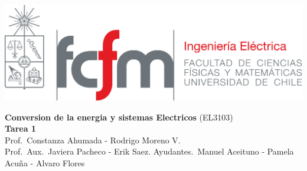 \documentclass[
  11pt,
  letterpaper,
   addpoints,
   answers
  ]{exam}
\begin{document}
\noindent
\begin{minipage}{0.47\textwidth}
\includegraphics[width=\textwidth]{../fcfm_die}
\end{minipage}
\begin{minipage}{0.53\textwidth}
\begin{center} 
\large\textbf{Conversion de la energia y sistemas Electricos} (EL3103) \\
\large\textbf{Tarea 1} \\
\normalsize Prof.~Constanza Ahumada - Rodrigo Moreno V.\\
\normalsize Prof.~Aux.~Javiera Pacheco - Erik Saez.
\normalsize Ayudantes.~Manuel Aceituno - Pamela Acuña - Alvaro Flores 
\end{center}
\end{minipage}
\end{document}
